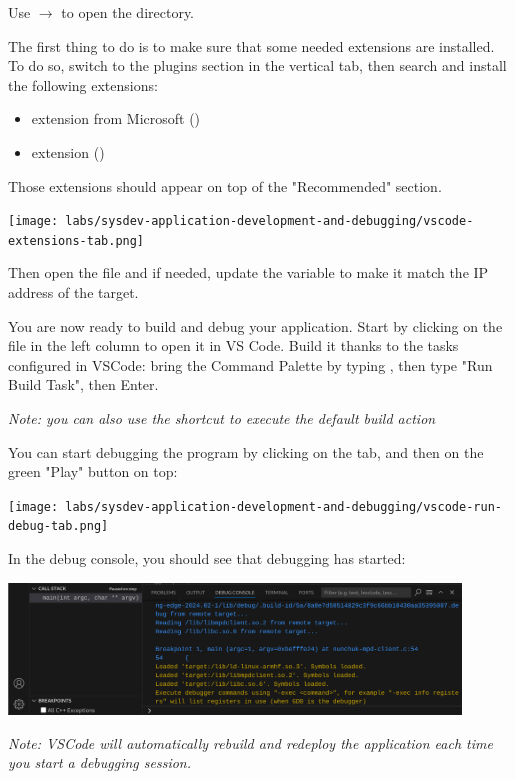 Use  $\rightarrow$  to open the
 directory.

The first thing to do is to make sure that some needed extensions are
installed. To do so, switch to the plugins section in the vertical tab,
then search and install the following extensions:
\begin{itemize}
	\item {} extension from Microsoft
		()
	\item {} extension
		()
\end{itemize}
Those extensions should appear on top of the "Recommended" section.

\texttt{[image: labs/sysdev-application-development-and-debugging/vscode-extensions-tab.png]}

Then open the  file and if needed, update the  variable
to make it match the IP address of the target.

You are now ready to build and debug your application. Start by clicking on
the  file in the left column to open it in VS
Code. Build it thanks to the tasks configured in VSCode: bring the Command
Palette by typing , then type "Run Build Task", then
Enter.

\textit{Note: you can also use the  shortcut to execute the
default build action}

You can start debugging the program by clicking on the 
tab, and then on the green "Play" button on top:

\texttt{[image: labs/sysdev-application-development-and-debugging/vscode-run-debug-tab.png]}

In the debug console, you should see that debugging has started:

\includegraphics[width=12cm]{labs/sysdev-application-development-and-debugging/vscode-debugging-started.png}

\textit{Note: VSCode will automatically rebuild and redeploy the
application each time you start a debugging session.}


